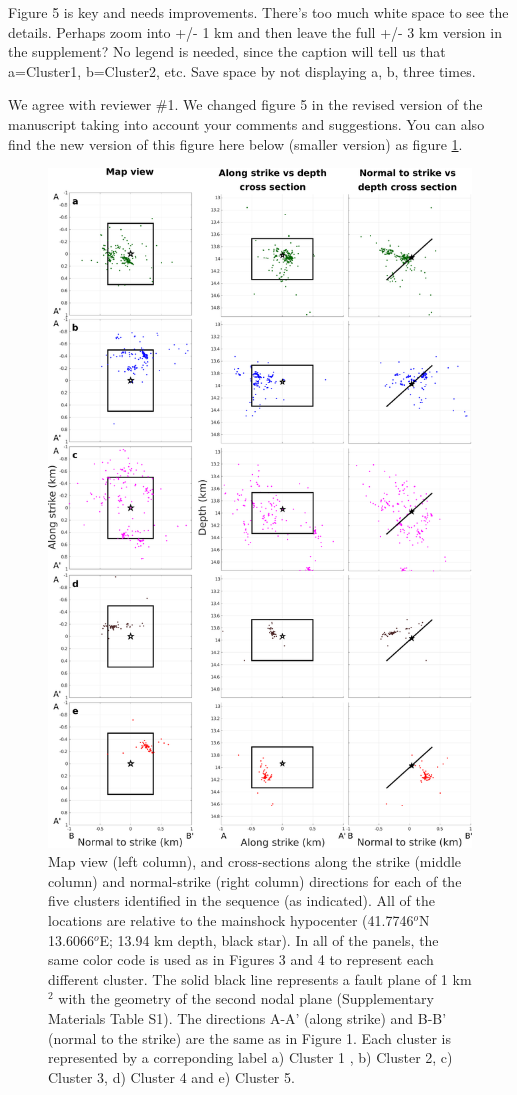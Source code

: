 \documentclass[10pt]{extarticle}
\begin{document}
\begin{ReviewerComment}{1}
\noindent 
Figure 5 is key and needs improvements. There's too much white space to see the details.  Perhaps zoom into +/- 1 km and then leave the full +/- 3 km version in the supplement? No legend is needed, since the caption will tell us that a=Cluster1, b=Cluster2, etc. Save space by not displaying a, b, three times.
\end{ReviewerComment}


\begin{Answer}
We agree with reviewer \#1. We changed figure 5 in the revised version of the manuscript taking into account your comments and suggestions. You can also find the new version of this figure here below (smaller version) as figure \ref{fig:map_improved}.
\begin{figure}[!h]
\begin{center}
 \includegraphics[width=0.7\linewidth]{maps_clusters}
\end{center}
\caption{Map view (left column), and cross-sections along the strike (middle column) and normal-strike (right column) directions for each of the five clusters identified in the sequence (as indicated). All of the locations are relative to the mainshock hypocenter (41.7746$^o$N 13.6066$^o$E; 13.94 km depth, black star). In all of the panels, the same color code is used as in Figures 3 and 4 to represent each different cluster. The solid black line represents a fault plane of 1 km$^2$ with the geometry of the second nodal plane (Supplementary Materials Table S1). The directions A-A' (along strike) and B-B' (normal to the strike) are the same as in Figure 1. Each cluster is represented by a correponding label a) Cluster 1 , b) Cluster 2, c) Cluster 3, d) Cluster 4 and e) Cluster 5.}
\label{fig:map_improved}
\end{figure}
 \WorkInProgressRevTask
\end{Answer}
%
%
\end{document}
